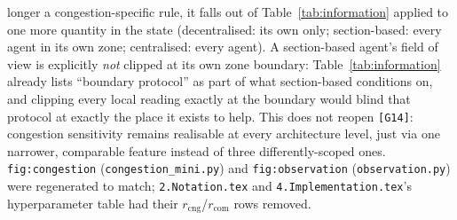 \documentclass[11pt]{article}
\begin{document}
longer a congestion-specific rule, it falls out of Table~\ref{tab:information}
applied to one more quantity in the state (decentralised: its own only;
section-based: every agent in its own zone; centralised: every agent). A
section-based agent's field of view is explicitly \emph{not} clipped at its
own zone boundary: Table~\ref{tab:information} already lists ``boundary
protocol'' as part of what section-based conditions on, and clipping every
local reading exactly at the boundary would blind that protocol at exactly
the place it exists to help. This does not reopen \texttt{[G14]}: congestion
sensitivity remains realisable at every architecture level, just via one
narrower, comparable feature instead of three differently-scoped ones.
\texttt{fig:congestion} (\texttt{congestion\_mini.py}) and \texttt{fig:observation}
(\texttt{observation.py}) were regenerated to match; \texttt{2.Notation.tex}
and \texttt{4.Implementation.tex}'s hyperparameter table had their
$r_{\mathrm{cng}}$/$r_{\mathrm{com}}$ rows removed.
\end{document}
